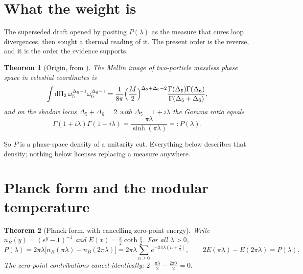 \documentclass[12pt,a4paper]{article}
\theoremstyle{plain}
\newtheorem{theorem}{Theorem}[section]
\theoremstyle{definition}
\theoremstyle{remark}
\newcommand{\dd}{\mathrm{d}}
\begin{document}
\section{What the weight is}

The superseded draft opened by positing $P(\lambda)$ as the measure
that cures loop divergences, then sought a thermal reading of it. The
present order is the reverse, and it is the order the evidence
supports.

\begin{theorem}[Origin, from \cite{ToupinLoops}]
\label{thm:origin}
The Mellin image of two-particle massless phase space in celestial
coordinates is
\begin{equation}
\int\dd\Pi_2\,\omega_5^{\Delta_5-1}\omega_6^{\Delta_6-1}
=\frac{1}{8\pi}\Bigl(\frac{M}{2}\Bigr)^{\Delta_5+\Delta_6-2}
\frac{\Gamma(\Delta_5)\Gamma(\Delta_6)}{\Gamma(\Delta_5+\Delta_6)} ,
\end{equation}
and on the shadow locus $\Delta_5+\Delta_6=2$ with
$\Delta_5=1+i\lambda$ the Gamma ratio equals
\begin{equation}
\Gamma(1+i\lambda)\Gamma(1-i\lambda)=\frac{\pi\lambda}{\sinh(\pi\lambda)}
=:P(\lambda).
\label{eq:P}
\end{equation}
\end{theorem}

So $P$ is a phase-space density of a unitarity cut. Everything below
describes that density; nothing below licenses replacing a measure
anywhere.

\section{Planck form and the modular temperature}

\begin{theorem}[Planck form, with cancelling zero-point energy]
\label{thm:planck}
Write $n_B(y)=(e^y-1)^{-1}$ and $E(x)=\tfrac{x}{2}\coth\tfrac{x}{2}$.
For all $\lambda>0$,
\begin{equation}
P(\lambda)
=2\pi\lambda\bigl[n_B(\pi\lambda)-n_B(2\pi\lambda)\bigr]
=2\pi\lambda\sum_{n\ge0}e^{-2\pi\lambda(n+\frac12)},
\qquad
2E(\pi\lambda)-E(2\pi\lambda)=P(\lambda).
\label{eq:planck}
\end{equation}
The zero-point contributions cancel identically:
$2\cdot\tfrac{\pi\lambda}{2}-\tfrac{2\pi\lambda}{2}=0$.
\end{theorem}
\end{document}
